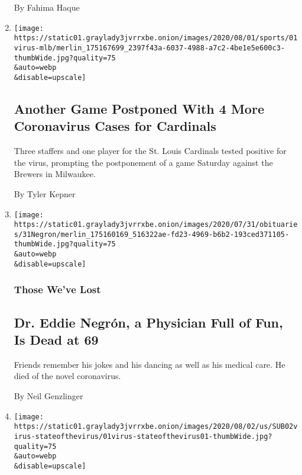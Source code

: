 \begin{enumerate}
  By Fahima Haque
\item
  \href{/2020/08/01/sports/baseball/coronavirus-cardinals.html}{}

  \texttt{[image: https://static01.graylady3jvrrxbe.onion/images/2020/08/01/sports/01virus-mlb/merlin\_175167699\_2397f43a-6037-4988-a7c2-4be1e5e600c3-thumbWide.jpg?quality=75\\\&auto=webp\\\&disable=upscale]}

  \hypertarget{another-game-postponed-with-4-more-coronavirus-cases-for-cardinals}{%
  \subsection{Another Game Postponed With 4 More Coronavirus Cases for
  Cardinals}\label{another-game-postponed-with-4-more-coronavirus-cases-for-cardinals}}

  Three staffers and one player for the St. Louis Cardinals tested
  positive for the virus, prompting the postponement of a game Saturday
  against the Brewers in Milwaukee.

  By Tyler Kepner
\item
  \href{/2020/08/01/obituaries/eddie-negron-dead-coronavirus.html}{}

  \texttt{[image: https://static01.graylady3jvrrxbe.onion/images/2020/07/31/obituaries/31Negron/merlin\_175160169\_516322ae-fd23-4969-b6b2-193ced371105-thumbWide.jpg?quality=75\\\&auto=webp\\\&disable=upscale]}

  \hypertarget{those-weve-lost}{%
  \subsubsection{Those We've Lost}\label{those-weve-lost}}

  \hypertarget{dr-eddie-negruxf3n-a-physician-full-of-fun-is-dead-at-69}{%
  \subsection{Dr. Eddie Negrón, a Physician Full of Fun, Is Dead at
  69}\label{dr-eddie-negruxf3n-a-physician-full-of-fun-is-dead-at-69}}

  Friends remember his jokes and his dancing as well as his medical
  care. He died of the novel coronavirus.

  By Neil Genzlinger
\item
  \href{/2020/08/01/us/coronavirus-midwest-cases-deaths.html}{}

  \texttt{[image: https://static01.graylady3jvrrxbe.onion/images/2020/08/02/us/SUB02virus-stateofthevirus/01virus-stateofthevirus01-thumbWide.jpg?quality=75\\\&auto=webp\\\&disable=upscale]}


\end{enumerate}
